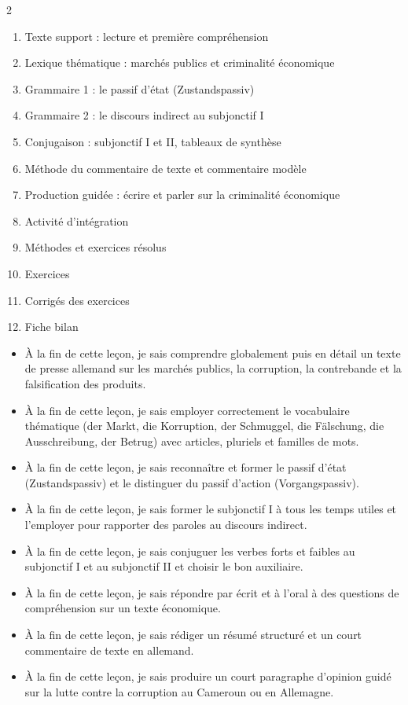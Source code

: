 \documentclass[11pt]{article}
\begin{document}
\begin{sommaire}
\begin{multicols}{2}
\begin{enumerate}
\item Texte support : lecture et première compréhension
\item Lexique thématique : marchés publics et criminalité économique
\item Grammaire 1 : le passif d'état (Zustandspassiv)
\item Grammaire 2 : le discours indirect au subjonctif I
\item Conjugaison : subjonctif I et II, tableaux de synthèse
\item Méthode du commentaire de texte et commentaire modèle
\item Production guidée : écrire et parler sur la criminalité économique
\item Activité d'intégration
\item Méthodes et exercices résolus
\item Exercices
\item Corrigés des exercices
\item Fiche bilan
\end{enumerate}
\end{multicols}
\end{sommaire}

\begin{objectifs}
\begin{itemize}
\item À la fin de cette leçon, je sais comprendre globalement puis en détail un texte de presse allemand sur les marchés publics, la corruption, la contrebande et la falsification des produits.
\item À la fin de cette leçon, je sais employer correctement le vocabulaire thématique (der Markt, die Korruption, der Schmuggel, die Fälschung, die Ausschreibung, der Betrug) avec articles, pluriels et familles de mots.
\item À la fin de cette leçon, je sais reconnaître et former le passif d'état (Zustandspassiv) et le distinguer du passif d'action (Vorgangspassiv).
\item À la fin de cette leçon, je sais former le subjonctif I à tous les temps utiles et l'employer pour rapporter des paroles au discours indirect.
\item À la fin de cette leçon, je sais conjuguer les verbes forts et faibles au subjonctif I et au subjonctif II et choisir le bon auxiliaire.
\item À la fin de cette leçon, je sais répondre par écrit et à l'oral à des questions de compréhension sur un texte économique.
\item À la fin de cette leçon, je sais rédiger un résumé structuré et un court commentaire de texte en allemand.
\item À la fin de cette leçon, je sais produire un court paragraphe d'opinion guidé sur la lutte contre la corruption au Cameroun ou en Allemagne.
\end{itemize}
\end{objectifs}
\end{document}
